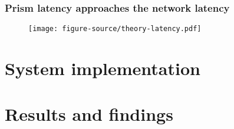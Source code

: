 \documentclass[svgnames]{beamer}
\begin{document}
\begin{frame}
    \frametitle{Prism latency approaches the network latency}
    \begin{figure}
        \centering
        \texttt{[image: figure-source/theory-latency.pdf]}
    \end{figure}
\end{frame}

\section{System implementation}

\begin{frame}
\end{frame}

\begin{frame}

\end{frame}

\section{Results and findings}

\begin{frame}
\end{frame}
\end{document}

